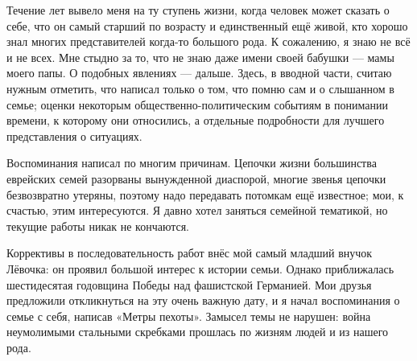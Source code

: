 \label{1-1}
Течение лет вывело меня на ту ступень жизни, когда человек может сказать о себе, что он самый старший по возрасту и единственный ещё живой, кто хорошо знал многих представителей когда-то большого рода. К сожалению, я знаю не всё и не всех. Мне стыдно за то, что не знаю даже имени своей бабушки — мамы моего папы. О подобных явлениях — дальше. Здесь, в вводной части, считаю нужным отметить, что написал только о том, что помню сам и о слышанном в семье; оценки некоторым общественно-политическим событиям в понимании времени, к которому они относились, а отдельные подробности для лучшего представления о ситуациях.

\label{1-2}
Воспоминания написал по многим причинам. Цепочки жизни большинства еврейских семей разорваны вынужденной диаспорой, многие звенья цепочки безвозвратно утеряны, поэтому надо передавать потомкам ещё известное; мои, к счастью, этим интересуются. Я давно хотел заняться семейной тематикой, но текущие работы никак не кончаются.

\label{2-1}
Коррективы в последовательность работ внёс мой самый младший внучок Лёвочка: он проявил большой интерес к истории семьи. Однако приближалась шестидесятая годовщина Победы над фашистской Германией. Мои друзья предложили откликнуться на эту очень важную дату, и я начал воспоминания о семье с себя, написав «Метры пехоты». Замысел темы не нарушен: война неумолимыми стальными скребками прошлась по жизням людей и из нашего рода.
